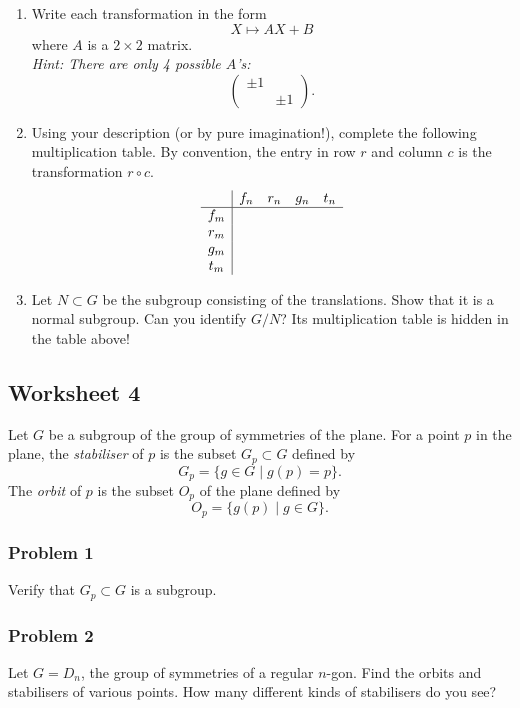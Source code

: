 \documentclass[11pt]{article}
\begin{document}
\begin{enumerate}
\item Write each transformation in the form
\[ X \mapsto AX + B\]
where \(A\) is a \(2 \times 2\) matrix.\\
\emph{Hint: There are only 4 possible \(A\)'s:}
\[
   \begin{pmatrix} \pm 1 & \\ & \pm 1 \end{pmatrix}.
   \]

\item Using your description (or by pure imagination!), complete the following multiplication table.
By convention, the entry in row \(r\) and column \(c\) is the transformation \(r \circ c\).
\[
\begin{array}{c | c c c c}
  & f_n & r_n & g_n & t_n \\
\hline f_m &  &  &  &  \\
 r_m &  &  &  &  \\
 g_m &  &  &  &  \\
 t_m &  &  &  &  \\
\end{array}
\]

\item Let \(N \subset G\) be the subgroup consisting of the translations.  
Show that it is a normal subgroup.
Can you identify \(G/N\)?
Its multiplication table is hidden in the table above!
\end{enumerate}

\subsection{Worksheet 4}
\label{sec:orga88a2bd}
Let \(G\) be a subgroup of the group of symmetries of the plane.
For a point \(p\) in the plane, the \emph{stabiliser} of \(p\) is the subset \(G_p \subset G\) defined by
\[ G_p = \{g \in G \mid g(p) = p\}.\]
The \emph{orbit} of \(p\) is the subset \(O_p\) of the plane defined by
\[ O_p = \{g(p) \mid g \in G\}.\]

\subsubsection{Problem 1}
\label{sec:orgab52d93}
Verify that \(G_p \subset G\) is a subgroup.

\subsubsection{Problem 2}
\label{sec:orgbadd66c}
Let \(G = D_n\), the group of symmetries of a regular \(n\)-gon.
Find the orbits and stabilisers of various points.
How many different kinds of stabilisers do you see?
\end{document}

